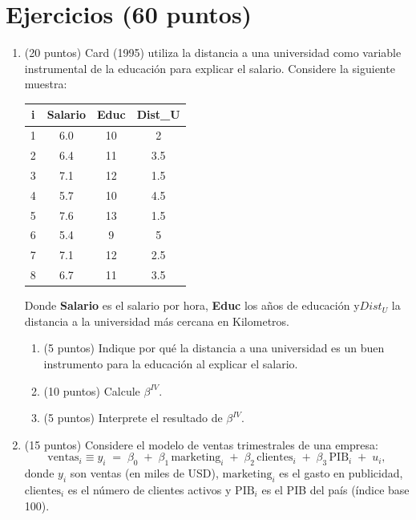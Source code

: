 \documentclass[10pt,a4paper]{article}
\begin{document}
\section{Ejercicios (60 puntos)}

\begin{enumerate}
    

\item (20 puntos) Card (1995) utiliza la distancia a una universidad como variable instrumental de la educación para explicar el salario. Considere la siguiente muestra:
\begin{center}
\begin{tabular}{|c|c|c|c|}
\hline
i & Salario & Educ & Dist_U \\
\hline
1 & 6.0 & 10 & 2 \\
2 & 6.4 & 11 & 3.5 \\
3 & 7.1 & 12 & 1.5 \\
4 & 5.7 & 10 & 4.5 \\
5 & 7.6 & 13 & 1.5 \\
6 & 5.4 &  9 & 5 \\
7 & 7.1 & 12 & 2.5 \\
8 & 6.7 & 11 & 3.5 \\
\hline
\end{tabular}
\end{center}
Donde \textbf{Salario} es el salario por hora, \textbf{Educ} los años de educación y\textbf{$Dist_U$} la distancia a la universidad más cercana en Kilometros.

\begin{enumerate}
    \item (5 puntos) Indique por qué la distancia a una universidad es un buen instrumento para la educación al explicar el salario.
    \item (10 puntos) Calcule \(\beta^{IV}\).
    \item (5 puntos) Interprete el resultado de \(\beta^{IV}\).
\end{enumerate}


 
    \item (15 puntos) Considere el modelo de ventas trimestrales de una empresa:
\[
\text{ventas}_i \equiv y_i \;=\; \beta_0 \;+\; \beta_1\,\text{marketing}_i \;+\; \beta_2\,\text{clientes}_i \;+\; \beta_3\,\text{PIB}_i \;+\; u_i,
\]
donde \(y_i\) son ventas (en miles de USD), \(\text{marketing}_i\) es el gasto en publicidad,
\(\text{clientes}_i\) es el número de clientes activos y \(\text{PIB}_i\) es el PIB del país (índice base 100).


\end{enumerate}
\end{document}
